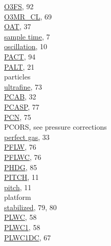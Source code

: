 \documentclass[
]{book}
\begin{document}
\href{./10-obsolete-variables.html\#o3fs}{O3FS}, 92\\
\href{./6-air-chemistry-measurements.html\#f03-acd\%7C}{O3MR\_CL}, 69\\
\href{./4-the-state-of-the-atmosphere.html\#oat\%7C}{OAT}, 37\\
\href{./2-general-information-about-data-files.html\#synchronization-of-measurements}{sample time}, 7\\
\href{./2-general-information-about-data-files.html\#bpitchr}{oscillation}, 10\\
\href{./10-obsolete-variables.html\#AACT}{PACT}, 94\\
\href{./3-the-state-of-the-aircraft.html\#palt}{PALT}, 21\\
particles\\
\hspace*{0.333em}\hspace*{0.333em}\href{./7-aerosol-particle-measurements.html\#condensation-nucleus-counter}{ultrafine}, 73\\
\href{./4-the-state-of-the-atmosphere.html\#p-special}{PCAB}, 32\\
\href{./7-aerosol-particle-measurements.html\#aerosol-spec}{PCASP}, 77\\
\href{./7-aerosol-particle-measurements.html\#pcn}{PCN}, 75\\
PCORS, see pressure corrections\\
\href{./3-the-state-of-the-aircraft.html\#ATX}{perfect gas}, 33\\
\href{./7-aerosol-particle-measurements.html\#pflw}{PFLW}, 76\\
\href{./7-aerosol-particle-measurements.html\#pflw}{PFLWC}, 76\\
\href{./10-obsolete-variables.html\#ltn51}{PHDG}, 85\\
\href{./3-the-state-of-the-aircraft.html\#pitch}{PITCH}, 11\\
\href{./3-the-state-of-the-aircraft.html\#pitch}{pitch}, 11\\
platform\\
\hspace*{0.333em}\hspace*{0.333em}\href{./8-radiation-variables.html\#spx}{stabilized}, 79, 80\\
\href{./5-cloud-physics-variables.html\#plwc}{PLWC}, 58\\
\href{./5-cloud-physics-variables.html\#plwc}{PLWC1}, 58\\
\href{./5-cloud-physics-variables.html\#lwc2d}{PLWC1DC}, 67\\
\end{document}
